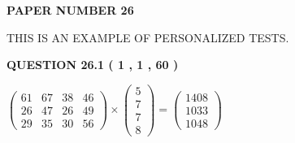 \documentclass[12pt]{article}
\begin{document}
 
 
   
   
\newpage 
\setcounter{page}{ 
    26001 } 
   
   
   
   
 {\textbf{ \Large{ PAPER NUMBER  26  }}}
   
   
\vspace{0.2in}
   
   
   
   
   
   
 \vspace{0.2in}
{\Huge  THIS IS AN EXAMPLE OF}
{\Huge  PERSONALIZED TESTS. }
   
   
  
\vspace{0.2in}
  
{\textbf{\Large{QUESTION
26.1 
 ( 1 , 1 , 60 )
}}}
  
  
 
 
\noindent{}

 
$\left( \begin{array}{ccccccccccccccc}
 61  & 
 67  & 
 38  & 
 46  \\ 
 26  & 
 47  & 
 26  & 
 49  \\ 
 29  & 
 35  & 
 30  & 
 56
\end{array}\right) \times
\left( \begin{array}{c}
 5  \\ 
 7  \\ 
 7  \\ 
 8
\end{array}\right)  =
\left( \begin{array}{c}
 1408  \\ 
 1033  \\ 
 1048
\end{array}\right)  $
 
\end{document}
